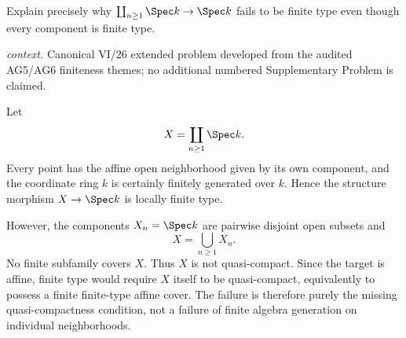 \begin{problem}\label{prob:vi26-p16}
Explain precisely why \(\coprod_{n\ge1}\Spec k\to\Spec k\) fails to be finite type even though every component is finite type.
\par\smallskip\noindent\textit{context.} Canonical VI/26 extended problem developed from the audited AG5/AG6 finiteness themes; no additional numbered Supplementary Problem is claimed.
\end{problem}

\ifdefined\FullProblemDossiers
\begin{solution}
Let
\[
X=\coprod_{n\ge1}\Spec k.
\]
Every point has the affine open neighborhood given by its own component, and the coordinate ring
\(k\) is certainly finitely generated over \(k\).  Hence the structure morphism \(X\to\Spec k\)
is locally finite type.

However, the components \(X_n=\Spec k\) are pairwise disjoint open subsets and
\[
X=\bigcup_{n\ge1}X_n.
\]
No finite subfamily covers \(X\).  Thus \(X\) is not quasi-compact.  Since the target is affine,
finite type would require \(X\) itself to be quasi-compact, equivalently to possess a finite
finite-type affine cover.  The failure is therefore purely the missing quasi-compactness condition,
not a failure of finite algebra generation on individual neighborhoods.
\end{solution}
\fi
